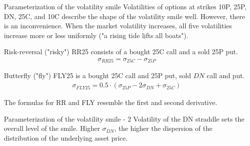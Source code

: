 \documentclass{beamer}
\begin{document}
\begin{frame}{Parameterization of the volatility smile}
\justify
Volatilities of options at strikes 10P, 25P, DN, 25C, and 10C describe the shape of the volatility smile well. However, there is an inconvenience. When the market volatility increases, all five volatilities increase more or less uniformly ("a rising tide lifts all boats").

\justify
\alert{Risk-reversal ("risky")} RR25 consists of a bought 25C call and a sold 25P put.
\begin{align*}
\sigma_{RR25} = \sigma_{25C} - \sigma_{25P}
\end{align*}

\justify
\alert{Butterfly ("fly")} FLY25 is a bought 25C call and 25P put, sold $DN$ call and put.
\begin{align*}
\sigma_{FLY25} = 0.5\cdot(\sigma_{25P} - 2\sigma_{DN} + \sigma_{25C})
\end{align*}

\justify
The formulas for RR and FLY resemble the first and second derivative.
\end{frame}



\begin{frame}{Parameterization of the volatility smile - 2}
\justify
Volatility of the DN straddle sets the overall level of the smile. Higher $\sigma_{DN}$, the higher the dispersion of the distribution of the underlying asset price.

\centering
{}
\end{frame}
\end{document}
